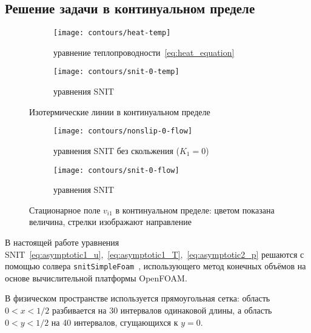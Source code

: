 \documentclass[10pt]{article}
\begin{document}
\subsection{Решение задачи в континуальном пределе}

\begin{figure}
    \centering
    \begin{subfigure}[b]{0.5\linewidth}
        \centering
        \texttt{[image: contours/heat-temp]}
        \caption{уравнение теплопроводности~\eqref{eq:heat_equation}}
        \label{fig:continuum:temp-heat}
    \end{subfigure}%
    \begin{subfigure}[b]{0.5\linewidth}
        \centering
        \texttt{[image: contours/snit-0-temp]}
        \caption{уравнения SNIT}
        \label{fig:continuum:temp-snit}
    \end{subfigure}
    \caption{Изотермические линии в континуальном пределе}
    \label{fig:continuum:temp}
\end{figure}

\begin{figure}
    \centering
    \begin{subfigure}{0.5\linewidth}
        \centering
        \texttt{[image: contours/nonslip-0-flow]}
        \caption{уравнения SNIT без скольжения (\(K_1=0\))}
        \label{fig:continuum:flow-nonslip}
    \end{subfigure}%
    \begin{subfigure}{0.5\linewidth}
        \centering
        \texttt{[image: contours/snit-0-flow]}
        \caption{уравнения SNIT}
        \label{fig:continuum:flow-snit}
    \end{subfigure}
    \caption{Стационарное поле \(v_{i1}\) в континуальном пределе: цветом показана величина, стрелки изображают направление}
    \label{fig:continuum:flow}
\end{figure}

В настоящей работе уравнения SNIT~\eqref{eq:asymptotic1_u},~\eqref{eq:asymptotic1_T},~\eqref{eq:asymptotic2_p}
решаются с помощью солвера \verb+snitSimpleFoam+~\cite{Rogozin2014},
использующего метод конечных объёмов на основе вычислительной платформы OpenFOAM\textregistered{}.

В физическом пространстве используется прямоугольная сетка:
область \(0<x<1/2\) разбивается на 30 интервалов одинаковой длины,
а область \(0<y<1/2\) на 40 интервалов, сгущающихся к \(y=0\).
\end{document}
